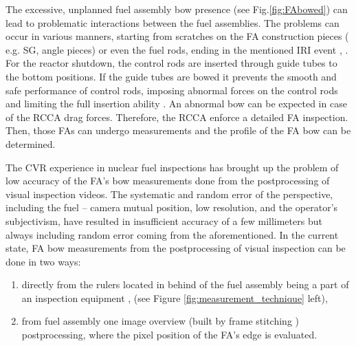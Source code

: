 \documentclass[preprint,12pt]{elsarticle}
\begin{document}
The excessive, unplanned fuel assembly bow presence (see Fig.\ref{fig:FAbowed}) can lead to problematic interactions between the fuel assemblies. The problems can occur in various manners, starting from scratches on the \ac{FA} construction pieces ( e.g. \ac{SG}, angle pieces) or even the fuel rods, ending in the mentioned \ac{IRI} event \cite{Ernst2010}, \cite{Hoglund2016}. For the reactor shutdown, the control rods are inserted through guide tubes to the bottom positions. If the guide tubes are bowed it prevents the smooth and safe performance of control rods, imposing abnormal forces on the control rods and limiting the full insertion ability \cite{Klouzal2015}. An abnormal bow can be expected in case of the \ac{RCCA}  drag forces. Therefore, the \ac{RCCA} enforce a detailed \ac{FA} inspection. Then, those \ac{FA}s can undergo measurements and the profile of the \ac{FA} bow can be determined. 

The \ac{CVR} experience in nuclear fuel inspections has brought up the problem of low accuracy of the \ac{FA}'s bow measurements done from the postprocessing of visual inspection videos. The systematic and random error of the perspective, including the fuel – camera mutual position, low resolution, and the operator's subjectivism, have resulted in insufficient accuracy of a few millimeters \cite{Mala2015} but always including random error coming from the aforementioned. In the current state, \ac{FA} bow measurements from the postprocessing of visual inspection can be done in two ways: 

\begin{enumerate}
    \item directly from the rulers located in behind of the fuel assembly being a part of an inspection equipment \cite{Mala2015}, \cite{Onneby2015} (see Figure \ref{fig:measurement_technique} left), 
    \item from fuel assembly one image overview (built by frame stitching \cite{Szeliski2006}) postprocessing, where the pixel position of the \ac{FA}'s edge is evaluated. 
\end{enumerate}
\end{document}
